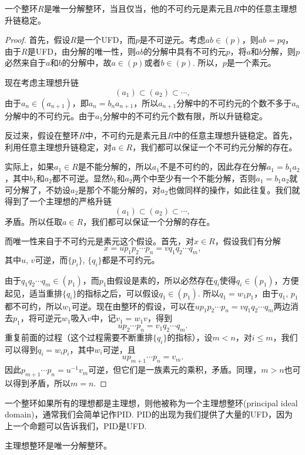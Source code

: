 \begin{pro}
一个整环$R$是唯一分解整环，当且仅当，他的不可约元是素元且$R$中的任意主理想升链稳定。
\end{pro}

\begin{proof}
首先，假设$R$是一个UFD，而$p$是不可逆元。考虑$ab\in (p)$，则$ab=pq$，由于$R$是UFD，由分解的唯一性，则$ab$的分解中具有不可约元$p$，将$a$和$b$分解，则$p$必然来自于$a$和$b$的分解中，故$a\in (p)$或者$b\in (p)$. 所以，$p$是一个素元。

现在考虑主理想升链
\[
	(a_1)\subset (a_2)\subset \cdots,
\]
由于$a_n\in (a_{n+1})$，即$a_n=b_na_{n+1}$，所以$a_{n+1}$分解中的不可约元的个数不多于$a_n$分解中的不可约元。由于$a_1$分解中的不可约元个数有限，所以升链稳定。

反过来，假设在整环$R$中，不可约元是素元且$R$中的任意主理想升链稳定。首先，利用任意主理想升链稳定，对$a\in R$，我们都可以保证一个不可约元分解的存在。

实际上，如果$a_1\in R$是不能分解的，所以$a_1$不是不可约的，因此存在分解$a_1=b_1a_2$，其中$b_1$和$a_2$都不可逆。显然$b_1$和$a_2$两个中至少有一个不能分解，否则$a_1=b_1a_2$就可分解了，不妨设$a_2$是那个不能分解的，对$a_2$也做同样的操作，如此往复。我们就得到了一个主理想的严格升链
\[
	(a_1)\subset (a_2)\subset \cdots,
\]
矛盾。所以任取$a\in R$，我们都可以保证一个分解的存在。

而唯一性来自于不可约元是素元这个假设。首先，对$x\in R$，假设我们有分解
\[
	x=up_1p_2\cdots p_n=vq_1q_2\cdots q_m,
\]
其中$u$, $v$可逆，而$\{p_i\}$, $\{q_i\}$都是不可约元。

由于$q_1q_2\cdots q_m\in (p_1)$，而$p_1$由假设是素的，所以必然存在$q_i$使得$q_i \in (p_1)$，方便起见，适当重排$\{q_i\}$的指标之后，可以假设$q_1\in (p_1)$. 所以$q_1=w_1p_1$，由于$q_1$, $p_1$都不可约，所以$w_1$可逆。现在由整环的假设，可以在$up_1p_2\cdots p_n=vq_1q_2\cdots q_m$两边消去$p_1$，将可逆元$w_1$吸入$v$中，记$v_1=w_1v$，得到
\[
	u p_2\cdots p_n= v_1q_2\cdots q_m.
\]
重复前面的过程（这个过程需要不断重排$\{q_i\}$的指标），设$m<n$，对$i\leq m$，我们可以得到$q_i=w_ip_i$，其中$w_i$可逆，且
\[
	u p_{m+1}\cdots p_n= v_m.
\]
因此$p_{m+1}\cdots p_n=u^{-1}v_m$可逆，但它们是一族素元的乘积，矛盾。同理，$m>n$也可以得到矛盾，所以$m=n$.
\end{proof}

一个整环如果所有的理想都是主理想，则他被称为一个主理想整环(principal ideal domain)，通常我们会简单记作PID. PID的出现为我们提供了大量的UFD，因为上一个命题可以告诉我们，PID是UFD.

\begin{pro}
主理想整环是唯一分解整环。
\end{pro}

